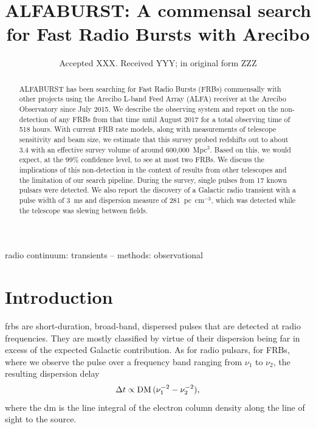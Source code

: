 \documentclass[a4paper,fleqn,usenatbib]{mnras}
\title[The ALFABURST Commensal FRB Survey]{ALFABURST: A commensal search for
Fast Radio Bursts with Arecibo}
\author[G. Foster et al.]{Griffin Foster$^{1,2}$\thanks{E-mail: griffin.foster@physics.ox.ac.uk},
Aris Karastergiou$^{1,3,4}$,
Golnoosh Golpayegani$^{5,6}$,
\and Mayuresh Surnis$^{5,6}$, 
Duncan R. Lorimer$^{5,6}$,
Jayanth Chennamangalam$^{1}$,
Maura McLaughlin$^{5,6}$,
\and Wes Armour$^{8}$,
Xin Pei$^{9}$,
Kaustubh Rajwade$^{7},
\and Dan Werthimer$^{2}$,
and Chris J. Williams$^{1}$
\\
$^{1}$University of Oxford, Sub-Department of Astrophysics, Denys Wilkinson Building, Keble Road, Oxford, OX1 3RH,\\United Kingdom\\
$^{2}$Department of Astronomy, University of California, Berkeley, 501 Campbell Hall \#3411, Berkeley, CA, 94720, USA\\
$^{3}$Physics Department, University of the Western Cape, Cape Town 7535, South Africa\\
$^{4}$Department of Physics and Electronics, Rhodes University, PO Box 94, Grahamstown 6140, South Africa\\
$^{5}$Department of Physics and Astronomy, West Virginia University, Morgantown, WV 26505, USA\\
$^{6}$Center for Gravitational Waves and Cosmology, West Virginia University, Chestnut Ridge Research Building, Morgantown,\\ WV 26505, USA\\
$^{7}$Jodrell Bank Centre for Astrophysics, University of Manchester, Oxford Road, Manchester M13 9PL, United Kingdom\\ 
$^{8}$OeRC, Department of Engineering Science, University of Oxford, Keble Road, Oxford, OX1 3QG, United Kingdom\\
$^{9}$Xinjiang Astronomical Observatory, Chinese Academy of Sciences, Urumqi, Xinjiang 830011, China\\
}
\date{Accepted XXX. Received YYY; in original form ZZZ}
\begin{document}
\label{firstpage}
\pagerange{\pageref{firstpage}--\pageref{lastpage}}
\maketitle

\begin{abstract}
ALFABURST has been searching for Fast Radio Bursts (FRBs) commensally with other
projects using the Arecibo L-band Feed Array (ALFA) receiver at the Arecibo
Observatory since July 2015. We describe the observing system and report on the
non-detection of any FRBs from that time until August 2017 for a total observing
time of 518 hours.  With current FRB rate models, along with measurements of
telescope sensitivity and beam size, we estimate that this survey probed
redshifts out to about 3.4 with an effective survey volume of around
600,000~Mpc$^3$. Based on this, we would expect, at the 99\% confidence level,
to see at most two FRBs.  We discuss the implications of this non-detection in
the context of results from other telescopes and the limitation of our search
pipeline.  During the survey, single pulses from 17 known pulsars were detected.
We also report the discovery of a Galactic radio transient with a
pulse width of 3~ms and dispersion measure of 281~pc~cm$^{-3}$, which was
detected while the telescope was slewing between fields.
\end{abstract}

\begin{keywords}
radio continuum: transients -- methods: observational
\end{keywords}


\section{Introduction}
\label{sec:intro}

\glspl{frb} are short-duration, broad-band, dispersed pulses that are detected
at radio frequencies. They are mostly classified by virtue of their dispersion
being far in excess of the expected Galactic contribution. As for radio pulsars,
for FRBs, where we observe the pulse over a frequency band ranging from $\nu_1$
to $\nu_2$, the resulting dispersion delay 
%
\begin{equation}
\Delta t \propto {\rm DM} \, (\nu_1^{-2} - \nu_2^{-2}),
\end{equation}
%
where the \gls{dm} is the line integral of the electron column
density along the line of sight to the source.
\end{document}
